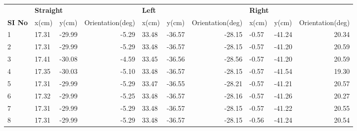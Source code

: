 



\begin{table}[]
\centering
\begin{tabular}{|l|l|l|r|l|l|r|l|l|r|}
\hline
                               & \multicolumn{3}{l|}{\textbf{Straight}} & \multicolumn{3}{l|}{\textbf{Left}} & \multicolumn{3}{l|}{\textbf{Right}} \\ \cline{2-10} 
\multirow{-2}{*}{\textbf{SI No}} & x(cm)           & y(cm)            & Orientation(deg)          & x(cm)  & y(cm)  & Orientation(deg) & x(cm)  & y(cm)   & Orientation(deg) \\ \hline
1                                                        & 17.31           & -29.99           & -5.29                     & 33.48  & -36.57 & -28.15           & -0.57  & -41.24  & 20.34            \\ \hline
2                                                        & 17.31           & -29.99           & -5.29                     & 33.48  & -36.57 & -28.15           & -0.57  & -41.20  & 20.59            \\ \hline
3                                                        & 17.41           & -30.08           & -4.59                     & 33.45  & -36.56 & -28.56           & -0.57  & -41.20  & 20.59            \\ \hline
4                                                        & 17.35           & -30.03           & -5.10                     & 33.48  & -36.57 & -28.15           & -0.57  & -41.54  & 19.30            \\ \hline
5                                                        & 17.31           & -29.99           & -5.29                     & 33.47  & -36.55 & -28.21           & -0.57  & -41.21  & 20.57            \\ \hline
6                                                        & 17.32           & -29.99           & -5.25                     & 33.48  & -36.57 & -28.16           & -0.57  & -41.26  & 20.27            \\ \hline
7                                                        & 17.31           & -29.99           & -5.29                     & 33.48  & -36.57 & -28.15           & -0.57  & -41.22  & 20.55            \\ \hline
8                                                        & 17.31           & -29.99           & -5.29                     & 33.48  & -36.57 & -28.15           & -0.56  & -41.24  & 20.54            \\ \hline

\end{tabular}
\end{table}
